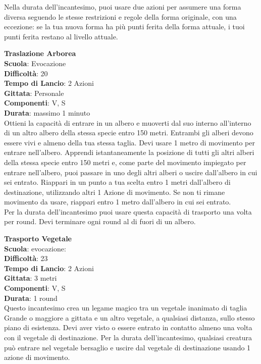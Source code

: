 \begin{multicols}{2}
Nella durata dell'incantesimo, puoi usare due azioni per assumere una forma diversa seguendo le stesse restrizioni e regole della forma originale, con una eccezione: se la tua nuova forma ha più punti ferita della forma attuale, i tuoi punti ferita restano al livello attuale.

\medskip\textbf{Traslazione Arborea}\\
\textbf{Scuola}: Evocazione\\
\textbf{Difficoltà}: 20\\
\textbf{Tempo di Lancio}: 2 Azioni\\
\textbf{Gittata}: Personale\\
\textbf{Componenti}: V, S\\
\textbf{Durata}: massimo 1 minuto\\
Ottieni la capacità di entrare in un albero e muoverti dal suo interno all'interno di un altro albero della stessa specie entro 150 metri. Entrambi gli alberi devono essere vivi e almeno della tua stessa taglia. Devi usare 1 metro di movimento per entrare nell'albero. Apprendi istantaneamente la posizione di tutti gli altri alberi della stessa specie entro 150 metri e, come parte del movimento impiegato per entrare nell'albero, puoi passare in uno degli altri alberi o uscire dall'albero in cui sei entrato. Riappari in un punto a tua scelta entro 1 metri dall'albero di destinazione, utilizzando altri 1 Azione di movimento. Se non ti rimane movimento da usare, riappari entro 1 metro dall'albero in cui sei entrato.\\
Per la durata dell'incantesimo puoi usare questa capacità di trasporto una volta per round. Devi terminare ogni round al di fuori di un albero.

\medskip\textbf{Trasporto Vegetale}\\
\textbf{Scuola}: evocazione:\\
\textbf{Difficoltà}: 23\\
\textbf{Tempo di Lancio}: 2 Azioni\\
\textbf{Gittata}: 3 metri\\
\textbf{Componenti}: V, S\\
\textbf{Durata}: 1 round\\
Questo incantesimo crea un legame magico tra un vegetale inanimato di taglia Grande o maggiore a gittata e un altro vegetale, a qualsiasi distanza, sullo stesso piano di esistenza. Devi aver visto o essere entrato in contatto almeno una volta con il vegetale di destinazione. Per la durata dell'incantesimo, qualsiasi creatura può entrare nel vegetale bersaglio e uscire dal vegetale di destinazione usando 1 azione di movimento.


\end{multicols}
